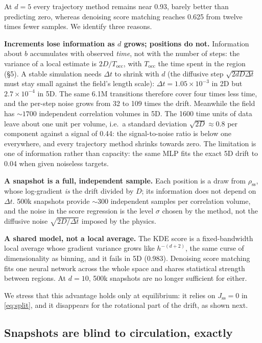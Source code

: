 \documentclass[11pt,a4paper]{article}
\newcommand{\dt}{\Delta t}
\newcommand{\rss}{\rho_{\mathrm{ss}}}
\begin{document}
At $d=5$ every trajectory method remains near 0.93, barely better than predicting zero,
whereas denoising score matching reaches 0.625 from twelve times fewer samples. We identify
three reasons.

\textbf{Increments lose information as $d$ grows; positions do not.} Information about $b$
accumulates with observed \emph{time}, not with the number of steps: the variance of a local
estimate is $2D/T_{\mathrm{occ}}$, with $T_{\mathrm{occ}}$ the time spent in the region (§5).
A stable simulation needs $\dt$ to shrink with $d$ (the diffusive step $\sqrt{2dD\dt}$ must
stay small against the field's length scale): $\dt=1.05\times10^{-3}$ in 2D but
$2.7\times10^{-4}$ in 5D. The same 6.1M transitions therefore cover four times less time,
and the per-step noise grows from 32 to 109 times the drift. Meanwhile the field has
${\sim}1700$ independent correlation volumes in 5D. The 1600 time units of data leave about
one unit per volume, i.e.\ a standard deviation $\sqrt{2D}\approx0.8$ per component against a
signal of 0.44: the signal-to-noise ratio is below one everywhere, and every trajectory
method shrinks towards zero. The limitation is one of information rather than capacity: the
same MLP fits the exact 5D drift to 0.04 when given noiseless targets.

\textbf{A snapshot is a full, independent sample.} Each position is a draw from $\rss$, whose
log-gradient \emph{is} the drift divided by $D$; its information does not depend on $\dt$.
500k snapshots provide ${\sim}300$ independent samples per correlation volume, and the noise
in the score regression is the level $\sigma$ chosen by the method, not the diffusive noise
$\sqrt{2D/\dt}$ imposed by the physics.

\textbf{A shared model, not a local average.} The KDE score is a fixed-bandwidth local average
whose gradient variance grows like $h^{-(d+2)}$, the same curse of dimensionality as binning,
and it fails in 5D (0.983). Denoising score matching fits one neural network across the whole
space and shares statistical strength between regions. At $d=10$, 500k snapshots are no
longer sufficient for either.

We stress that this advantage holds only at equilibrium: it relies on $J_{\mathrm{ss}}=0$ in
\eqref{eq:split}, and it disappears for the rotational part of the drift, as shown next.

\subsection{Snapshots are blind to circulation, exactly}
\end{document}
